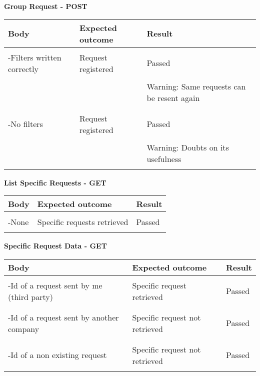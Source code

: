 \textbf{Group Request - POST}
\begin{center}
	\begin{tabular}{|p{}|p{}|p{}|}
		\hline
		Body & Expected outcome & Result \\
		\hline
		&&\\
		-Filters written correctly&Request registered&Passed\\
		&&\\
		&&Warning: Same requests can be resent again\\
		&&\\
		\hline
		&&\\
		-No filters &Request registered&Passed\\
		&&\\
		&&Warning: Doubts on its usefulness\\
		&&\\
		\hline
	\end{tabular}
\end{center}
\textbf{List Specific Requests - GET}
\begin{center}
	\begin{tabular}{|p{}|p{}|p{}|}
		\hline
		Body & Expected outcome & Result \\
		\hline
		&&\\
		-None  &Specific requests retrieved&Passed\\
		&&\\
		\hline
	\end{tabular}
\end{center}
\newpage
\textbf{Specific Request Data - GET}
\begin{center}
	\begin{tabular}{|p{}|p{}|p{}|}
		\hline
		Body & Expected outcome & Result \\
		\hline
		&&\\
		-Id of a request sent by me (third party)  &Specific request retrieved&Passed\\
		&&\\
		\hline
		&&\\
		-Id of a request sent by another company  &Specific request not retrieved&Passed\\
		&&\\
		\hline
		&&\\
		-Id of a non existing request  &Specific request not retrieved&Passed\\
		&&\\
		\hline
	\end{tabular}
\end{center}
